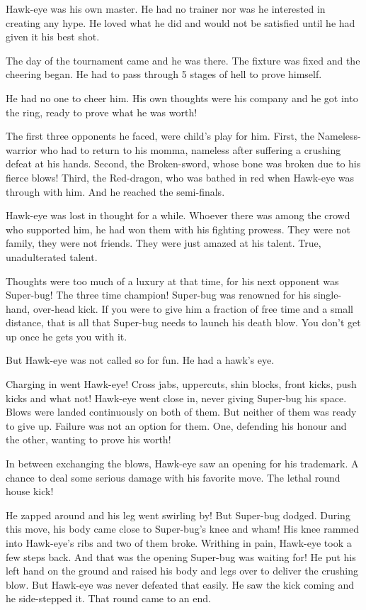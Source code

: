 \documentclass[twoside,11pt,titlepage]{article}
\begin{document}
Hawk-eye was his own master. He had no trainer nor was he interested in creating any hype. He loved what he did and would not be satisfied until he had given it his best shot.

The day of the tournament came and he was there. The fixture was fixed and the cheering began. He had to pass through 5 stages of hell to prove himself.

He had no one to cheer him. His own thoughts were his company and he got into the ring, ready to prove what he was worth!

The first three opponents he faced, were child's play for him. First, the Nameless-warrior who had to return to his momma, nameless after suffering a crushing defeat at his hands. Second, the Broken-sword, whose bone was broken due to his fierce blows! Third, the Red-dragon, who was bathed in red when Hawk-eye was through with him. And he reached the semi-finals.

Hawk-eye was lost in thought for a while. Whoever there was among the crowd who supported him, he had won them with his fighting prowess. They were not family, they were not friends. They were just amazed at his talent. True, unadulterated talent.

Thoughts were too much of a luxury at that time, for his next opponent was Super-bug! The three time champion! Super-bug was renowned for his single-hand, over-head kick. If you were to give him a fraction of free time and a small distance, that is all that Super-bug needs to launch his death blow. You don't get up once he gets you with it.

But Hawk-eye was not called so for fun. He had a hawk's eye.

Charging in went Hawk-eye! Cross jabs, uppercuts, shin blocks, front kicks, push kicks and what not! Hawk-eye went close in, never giving Super-bug his space. Blows were landed continuously on both of them. But neither of them was ready to give up. Failure was not an option for them. One, defending his honour and the other, wanting to prove his worth!

In between exchanging the blows, Hawk-eye saw an opening for his trademark. A chance to deal some serious damage with his favorite move. The lethal round house kick!

He zapped around and his leg went swirling by! But Super-bug dodged. During this move, his body came close to Super-bug's knee and wham! His knee rammed into Hawk-eye's ribs and two of them broke. Writhing in pain, Hawk-eye took a few steps back. And that was the opening Super-bug was waiting for! He put his left hand on the ground and raised his body and legs over to deliver the crushing blow. But Hawk-eye was never defeated that easily. He saw the kick coming and he side-stepped it. That round came to an end.
\end{document}
